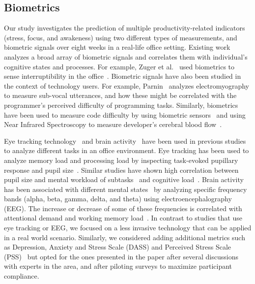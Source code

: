 \subsection{Biometrics}
Our study investigates the prediction of multiple productivity-related indicators (stress, focus, and awakeness) using two different types of measurements, and biometric signals over eight weeks in a real-life office setting.
Existing work~\cite{sano2013stress,healey2005detecting,wijsman2011towards,zuger2015interruptibility,goyal2017intelligent,Parnin2011,Nakagawa2014,Radevski2015} analyzes a broad array of biometric signals and correlates them with individual's cognitive states and processes.
For example, Zuger et al.~\cite{zuger18} used biometrics to sense interruptibility in the office~\cite{zuger18}.
Biometric signals have also been studied in the context of technology users. For example, Parnin~\cite{Parnin2011} analyzes electromyography to measure sub-vocal utterances, and how these might be correlated with the programmer's perceived difficulty of programming tasks. Similarly, biometrics have been used to measure code difficulty by using biometric sensors~\cite{fritz2014using}
and using Near Infrared Spectroscopy to measure developer's cerebral blood flow~\cite{Nakagawa2014}.

Eye tracking technology~\cite{Bednarik2006,Crosby1990,Rodeghero2014} and brain activity~\cite{Ikutani2014,Siegmund2014} 
have been used in previous studies to analyze different tasks in an office environment.
Eye tracking has been used to analyze memory load and processing load by inspecting task-evoked pupillary response and pupil size~\cite{beatty82}. Similar studies have shown high correlation between pupil size and mental workload of subtasks~\cite{beatty82} and cognitive load~\cite{Klingner10}.
Brain activity has been associated with different mental states~\cite{Berger29} by analyzing specific frequency bands (alpha, beta, gamma, delta, and theta) using electroencephalography (EEG). The increase or decrease of some of these frequencies is correlated with
attentional demand and working memory load~\cite{Smith05,sterman93}.
In contrast to studies that use eye tracking or EEG, we focused on a less invasive technology that can be applied in a real world scenario.
Similarly, we considered adding additional metrics such as Depression, Anxiety and Stress Scale (DASS) and Perceived Stress Scale (PSS)~\cite{Ferdous15} but opted for the ones presented in the paper after several discussions with experts in the area, and after piloting surveys to maximize participant compliance.


